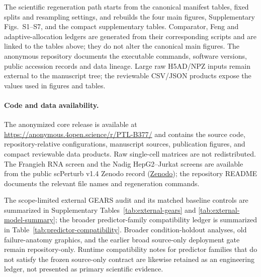 \documentclass{article}
\begin{document}
The scientific regeneration path starts from the canonical manifest tables, fixed splits and resampling settings, and rebuilds the four main figures, Supplementary Figs.~S1--S7, and the compact supplementary tables. Comparator, Feng and adaptive-allocation ledgers are generated from their corresponding scripts and are linked to the tables above; they do not alter the canonical main figures. The anonymous repository documents the executable commands, software versions, public accession records and data lineage. Large raw H5AD/NPZ inputs remain external to the manuscript tree; the reviewable CSV/JSON products expose the values used in figures and tables.

\paragraph{Code and data availability.}
The anonymized core release is available at
\url{https://anonymous.4open.science/r/PTL-B377/} and contains
the source code, repository-relative configurations, manuscript sources,
publication figures, and compact reviewable data products. Raw single-cell
matrices are not redistributed. The Frangieh RNA screen and the Nadig
HepG2--Jurkat screens are available from the public scPerturb v1.4 Zenodo
record (\href{https://zenodo.org/records/13350497}{Zenodo}); the repository README
documents the relevant file names and regeneration commands.

The scope-limited external GEARS audit and its matched baseline controls are
summarized in Supplementary Tables~\ref{tab:external-gears} and
\ref{tab:external-model-summary}; the broader predictor-family compatibility
ledger is summarized in Table~\ref{tab:predictor-compatibility}. Broader
condition-holdout analyses, old failure-anatomy graphics, and the earlier
broad source-only deployment gate remain repository-only. Runtime compatibility
notes for predictor families that do not satisfy the frozen source-only
contract are likewise retained as an engineering ledger, not presented as
primary scientific evidence.



\end{document}
